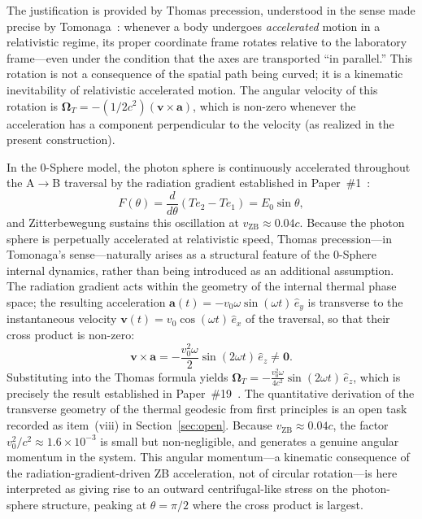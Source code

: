 \documentclass[%
 reprint, amsmath,amssymb, aps, prb, ]{revtex4-2}
\numberwithin{equation}{section}
\newcommand{\iphase}{\theta}
\begin{document}
The justification is provided by Thomas precession, understood in the sense made precise by Tomonaga~\cite{Tomonaga1997}: whenever a body undergoes \emph{accelerated} motion in a relativistic regime, its proper coordinate frame rotates relative to the laboratory frame---even under the condition that the axes are transported ``in parallel.'' This rotation is not a consequence of the spatial path being curved; it is a kinematic inevitability of relativistic accelerated motion. The angular velocity of this rotation is $\boldsymbol{\Omega}_T = -(1/2c^2)(\mathbf{v} \times \mathbf{a})$, which is non-zero whenever the acceleration has a component perpendicular to the velocity (as realized in the present construction).

In the 0-Sphere model, the photon sphere is continuously accelerated throughout the A$\to$B traversal by the radiation gradient established in Paper~\#1~\cite{hanamura01}:
\begin{equation}
F(\iphase) = \frac{d}{d\iphase}(Te_2 - Te_1) = E_0\sin\iphase,
\label{eq:radiation_force}
\end{equation}
and Zitterbewegung sustains this oscillation at $v_{\text{ZB}} \approx 0.04c$. Because the photon sphere is perpetually accelerated at relativistic speed, Thomas precession---in Tomonaga's sense---naturally arises as a structural feature of the 0-Sphere internal dynamics, rather than being introduced as an additional assumption. The radiation gradient acts within the geometry of the internal thermal phase space; the resulting acceleration $\mathbf{a}(t) = -v_0\omega\sin(\omega t)\,\hat{e}_y$ is transverse to the instantaneous velocity $\mathbf{v}(t) = v_0\cos(\omega t)\,\hat{e}_x$ of the traversal, so that their cross product is non-zero:
\begin{equation}
\mathbf{v} \times \mathbf{a} = -\frac{v_0^2\omega}{2}\sin(2\omega t)\,\hat{e}_z \neq \mathbf{0}.
\label{eq:cross_product}
\end{equation}
Substituting into the Thomas formula yields $\boldsymbol{\Omega}_T = -\frac{v_0^2\omega}{4c^2}\sin(2\omega t)\,\hat{e}_z$, which is precisely the result established in Paper~\#19~\cite{hanamura19}. The quantitative derivation of the transverse geometry of the thermal geodesic from first principles is an open task recorded as item~(viii) in Section~\ref{sec:open}. Because $v_{\text{ZB}} \approx 0.04c$, the factor $v_0^2/c^2 \approx 1.6\times10^{-3}$ is small but non-negligible, and generates a genuine angular momentum in the system. This angular momentum---a kinematic consequence of the radiation-gradient-driven ZB acceleration, not of circular rotation---is here interpreted as giving rise to an outward centrifugal-like stress on the photon-sphere structure, peaking at $\theta = \pi/2$ where the cross product is largest.
\end{document}
